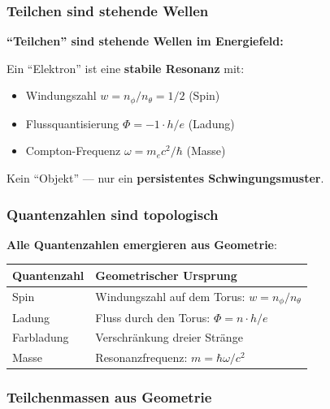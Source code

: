 	\subsubsection{Teilchen sind stehende Wellen}
	
	\begin{keyresult}
		\textbf{\enquote{Teilchen} sind stehende Wellen im Energiefeld:}
		
		\vspace{0.3cm}
		
		Ein \enquote{Elektron} ist eine \textbf{stabile Resonanz} mit:
		\begin{itemize}
			\item Windungszahl $w = n_\phi/n_\theta = 1/2$ (Spin)
			\item Flussquantisierung $\Phi = -1 \cdot h/e$ (Ladung)
			\item Compton-Frequenz $\omega = m_e c^2 / \hbar$ (Masse)
		\end{itemize}
		
		\vspace{0.3cm}
		
		Kein \enquote{Objekt} — nur ein \textbf{persistentes Schwingungsmuster}.
	\end{keyresult}
	
	\subsubsection{Quantenzahlen sind topologisch}
	
	\textbf{Alle Quantenzahlen emergieren aus Geometrie}:
	
	\begin{center}
		\begin{tabular}{ll}
			\toprule
			\textbf{Quantenzahl} & \textbf{Geometrischer Ursprung} \\
			\midrule
			Spin & Windungszahl auf dem Torus: $w = n_\phi/n_\theta$ \\
			Ladung & Fluss durch den Torus: $\Phi = n \cdot h/e$ \\
			Farbladung & Verschränkung dreier Stränge \\
			Masse & Resonanzfrequenz: $m = \hbar\omega/c^2$ \\
			\bottomrule
		\end{tabular}
	\end{center}
	
	\subsubsection{Teilchenmassen aus Geometrie}
	
